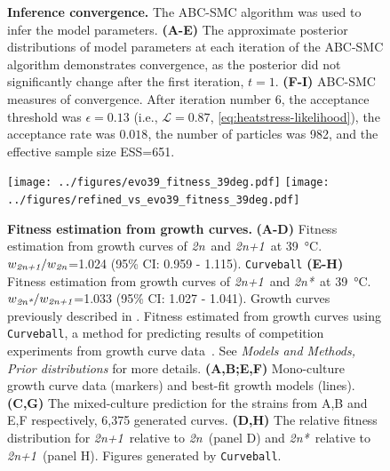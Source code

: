 \documentclass[12pt]{extarticle}
\newcommand{\likelihood}{\mathcal{L}}
\newcommand{\euwt}{\emph{2n}}
\newcommand{\anwt}{\emph{2n+1}}
\newcommand{\eumt}{\emph{2n*}}
\begin{document}
\begin{figure}[p]
\begin{subfigure}{1\textwidth}
     \label{fig:convergence-B}
  \end{subfigure}
    \caption{
    \textbf{Inference convergence.} 
    The ABC-SMC algorithm was used to infer the model parameters. \textbf{(A-E)} The approximate posterior distributions of model parameters at each iteration of the ABC-SMC algorithm demonstrates convergence, as the posterior did not significantly change after the first iteration, $t=1$.
    \textbf{(F-I)} ABC-SMC measures of convergence. After iteration number 6, the acceptance threshold was $\epsilon=0.13$ (i.e., $\likelihood=0.87$, \cref{eq:heatstress-likelihood}), the acceptance rate was $0.018$, the number of particles was 982, and the effective sample size ESS=651.
}
    \label{fig:convergence}
\end{figure}



\begin{figure}[p]
	\centering
	\texttt{[image: ../figures/evo39\_fitness\_39deg.pdf]} 
	\texttt{[image: ../figures/refined\_vs\_evo39\_fitness\_39deg.pdf]}
\caption{
    \textbf{Fitness estimation from growth curves.}
    \textbf{(A-D)} Fitness estimation from growth curves of \euwt\ and \anwt\ at \SI{39}{\celsius}. $ w_{\anwt}/w_{\euwt}$=1.024 (95\% CI: 0.959 - 1.115). \texttt{Curveball} 
    \textbf{(E-H)} Fitness estimation from growth curves of \anwt\ and \eumt\ at \SI{39}{\celsius}. $ w_{\eumt}/w_{\anwt}$=1.033 (95\% CI: 1.027 - 1.041).
    Growth curves previously described in \citet[Figs. 3C, 4A, and S2]{Yona2012}.
	Fitness estimated from growth curves using \texttt{Curveball}, a method for predicting results of competition experiments from growth curve data~\citep[\href{https://curveball.yoavram.com}{curveball.yoavram.com}]{Ram2019}. See \emph{Models and Methods, Prior distributions} for more details.  \textbf{(A,B;E,F)} Mono-culture growth curve data (markers) and best-fit growth models (lines).
\textbf{(C,G)} The mixed-culture prediction for the strains from A,B and E,F respectively, 6,375 generated curves. \textbf{(D,H)} The relative fitness distribution for \anwt\ relative to \euwt\ (panel D) and \eumt\ relative to \anwt\ (panel H). Figures generated by \texttt{Curveball}.
} 
\label{fig:growth-curves}
\end{figure}
\end{document}
